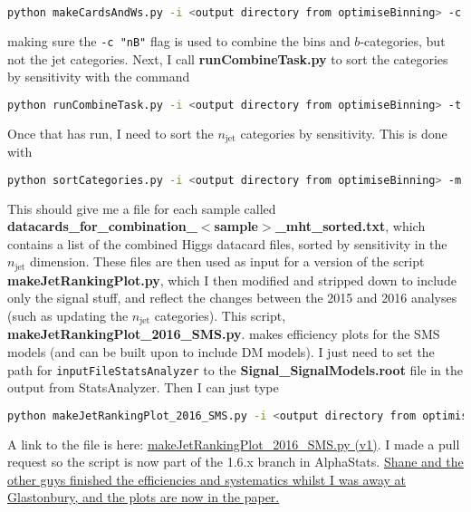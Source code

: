 \begin{lstlisting}[belowskip=-0.7cm, language=sh, numbers=none]
python makeCardsAndWs.py -i <output directory from optimiseBinning> -c "nB"
\end{lstlisting}

making sure the \verb!-c "nB"! flag is used to combine the \HT bins and $b$-categories, but not the jet categories. Next, I call \textbf{runCombineTask.py} to sort the categories by sensitivity with the command

\begin{lstlisting}[belowskip=-0.7cm, language=sh, numbers=none]
python runCombineTask.py -i <output directory from optimiseBinning> -t ASCLS_UL_PRIOR --what expected
\end{lstlisting}

Once that has run, I need to sort the $n_{\mathrm{jet}}$ categories by sensitivity. This is done with

\begin{lstlisting}[belowskip=-0.7cm, language=sh, numbers=none]
python sortCategories.py -i <output directory from optimiseBinning> -m ul -c "nB"
\end{lstlisting}

This should give me a file for each sample called \textbf{datacards\_for\_combination\_$<$sample$>$\_mht\_sorted.txt}, which contains a list of the combined Higgs datacard files, sorted by sensitivity in the $n_{\mathrm{jet}}$ dimension. These files are then used as input for a version of the script \textbf{makeJetRankingPlot.py}, which I then modified and stripped down to include only the signal stuff, and reflect the changes between the 2015 and 2016 analyses (such as updating the $n_{\mathrm{jet}}$ categories). This script, \textbf{makeJetRankingPlot\_2016\_SMS.py}. makes efficiency plots for the SMS models (and can be built upon to include DM models). I just need to set the path for \verb!inputFileStatsAnalyzer! to the \textbf{Signal\_SignalModels.root} file in the output from StatsAnalyzer. Then I can just type

\begin{lstlisting}[belowskip=-0.7cm, language=sh, numbers=none]
python makeJetRankingPlot_2016_SMS.py -i <output directory from optimiseBinning> -o <output directory for efficiency plots>
\end{lstlisting}

A link to the file is here: \href{run:sec23/makeJetRankingPlot_2016_SMSv1.py}{makeJetRankingPlot\_2016\_SMS.py (v1)}. I made a pull request so the script is now part of the 1.6.x branch in AlphaStats. \uline{Shane and the other guys finished the efficiencies and systematics whilst I was away at Glastonbury, and the plots are now in the paper.}


